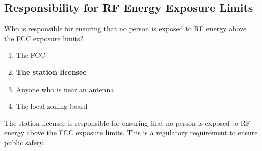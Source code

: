 \subsection{Responsibility for RF Energy Exposure Limits}
\label{T0C13}

\begin{tcolorbox}[colback=gray!10!white,colframe=black!75!black,title=T0C13]
Who is responsible for ensuring that no person is exposed to RF energy above the FCC exposure limits?
\begin{enumerate}[noitemsep]
    \item The FCC
    \item \textbf{The station licensee}
    \item Anyone who is near an antenna
    \item The local zoning board
\end{enumerate}
\end{tcolorbox}

The station licensee is responsible for ensuring that no person is exposed to RF energy above the FCC exposure limits. This is a regulatory requirement to ensure public safety.